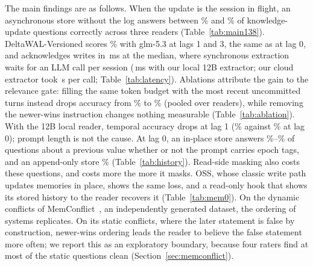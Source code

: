 The main findings are as follows. When the update is the session in flight, an asynchronous store without the log answers between \% and \% of knowledge-update questions correctly across three readers (Table~\ref{tab:main138}). DeltaWAL-Versioned scores \% with glm-5.3 at lags 1 and 3, the same as at lag 0, and acknowledges writes in \,ms at the median, where synchronous extraction waits for an LLM call per session (\,ms with our local 12B extractor; our cloud extractor took \,s per call; Table~\ref{tab:latency}). Ablations attribute the gain to the relevance gate: filling the same token budget with the most recent uncommitted turns instead drops accuracy from \% to \% (pooled over readers), while removing the newer-wins instruction changes nothing measurable (Table~\ref{tab:ablation}). With the 12B local reader, temporal accuracy drops at lag 1 (\% against \% at lag 0); prompt length is not the cause. At lag 0, an in-place store answers \%--\% of questions about a previous value whether or not the prompt carries epoch tags, and an append-only store \% (Table~\ref{tab:history}). Read-side masking also costs these questions, and costs more the more it masks. \memzero{} OSS, whose classic write path updates memories in place, shows the same loss, and a read-only hook that shows its stored history to the reader recovers it (Table~\ref{tab:mem0}). On the dynamic conflicts of MemConflict~\citep{tao2026memconflict}, an independently generated dataset, the ordering of systems replicates. On its static conflicts, where the later statement is false by construction, newer-wins ordering leads the reader to believe the false statement more often; we report this as an exploratory boundary, because four raters find at most  of the  static questions clean (Section~\ref{sec:memconflict}).

